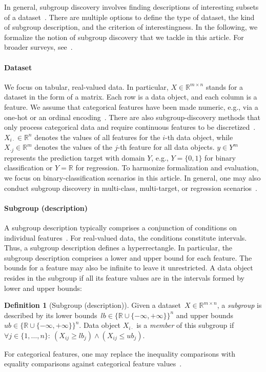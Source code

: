 \documentclass{article}
\theoremstyle{definition}
\newtheorem{definition}{Definition}
\begin{document}
In general, subgroup discovery involves finding descriptions of interesting subsets of a dataset~\cite{atzmueller2015subgroup}.
There are multiple options to define the type of dataset, the kind of subgroup description, and the criterion of interestingness.
In the following, we formalize the notion of subgroup discovery that we tackle in this article.
For broader surveys, see~\cite{atzmueller2015subgroup, helal2016subgroup, herrera2011overview, ventura2018subgroup}.

\paragraph{Dataset}

We focus on tabular, real-valued data.
In particular, $X \in \mathbb{R}^{m \times n}$ stands for a dataset in the form of a matrix.
Each row is a data object, and each column is a feature.
We assume that categorical features have been made numeric, e.g., via a one-hot or an ordinal encoding~\cite{matteucci2023benchmark}.
There are also subgroup-discovery methods that only process categorical data and require continuous features to be discretized~\cite{herrera2011overview, meeng2021real}.
$X_{i \cdot} \in \mathbb{R}^n$ denotes the values of all features for the $i$-th data object,
while $X_{\cdot j} \in \mathbb{R}^m$ denotes the values of the $j$-th feature for all data objects.
$y \in Y^m$ represents the prediction target with domain $Y$, e.g., $Y=\{0,1\}$ for binary classification or $Y=\mathbb{R}$ for regression.
To harmonize formalization and evaluation, we focus on binary-classification scenarios in this article.
In general, one may also conduct subgroup discovery in multi-class, multi-target, or regression scenarios~\cite{atzmueller2015subgroup}.

\paragraph{Subgroup (description)}

A subgroup description typically comprises a conjunction of conditions on individual features~\cite{meeng2021real}.
For real-valued data, the conditions constitute intervals.
Thus, a subgroup description defines a hyperrectangle.
In particular, the subgroup description comprises a lower and upper bound for each feature.
The bounds for a feature may also be infinite to leave it unrestricted.
A data object resides in the subgroup if all its feature values are in the intervals formed by lower and upper bounds:
%
\begin{definition}[Subgroup (description)]
	Given a dataset~$X \in \mathbb{R}^{m \times n}$, a \emph{subgroup} is described by its lower bounds~$\mathit{lb} \in \{\mathbb{R} \cup \{-\infty, +\infty\}\}^n$ and upper bounds~$\mathit{ub} \in \{\mathbb{R} \cup \{-\infty, +\infty\}\}^n$.
	Data object $X_{i \cdot}$ is a \emph{member} of this subgroup if $\forall j \in \{1, \dots, n\}:~ \left( X_{ij} \geq \mathit{lb}_j \right) \land \left( X_{ij} \leq \mathit{ub}_j \right)$.
	\label{def:csd:subgroup}
\end{definition}
%
For categorical features, one may replace the inequality comparisons with equality comparisons against categorical feature values~\cite{atzmueller2015subgroup}.
\end{document}

